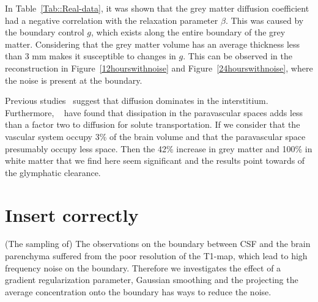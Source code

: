\documentclass[12pt,a4paper]{article}
\begin{document}
In Table~\ref{Tab::Real-data}, it was shown that the grey matter diffusion coefficient had a negative correlation with the relaxation parameter $\beta$. This was caused by the boundary control $g$, which exists along the entire boundary of the grey matter. Considering that the grey matter volume has an average thickness less than 3 mm makes it susceptible to changes in $g$. This can be observed in the reconstruction in Figure~\ref{12hourswithnoise} and Figure~\ref{24hourswithnoise}, where the noise is present at the boundary.
  
Previous studies~\cite{holter2017interstitial, smith2017glymphatic} suggest that diffusion dominates in the interstitium. Furthermore, ~\cite{asgari2016glymphatic, brynjfm, Diem} have found that dissipation in the paravascular spaces adds less than a factor two
to diffusion for solute transportation. If we consider that the vascular system occupy 3\% of the brain volume
and that the paravascular space presumably occupy less space. Then the 42\% increase in grey matter and 100\% in white matter that we find here seem significant and the results point towards of the glymphatic clearance.  

  
  
\section{Insert correctly}
(The sampling of) The observations on the boundary between CSF and the brain parenchyma suffered from the poor resolution of the T1-map, which lead to high frequency noise on the boundary. Therefore we investigates the effect of a gradient regularization parameter, Gaussian smoothing and the projecting the average concentration onto the boundary has ways to reduce the noise. 
\end{document}
